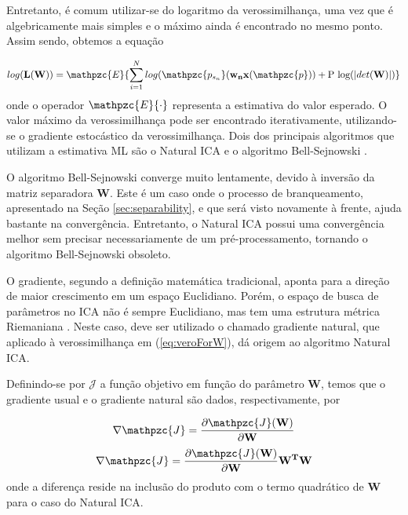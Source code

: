     Entretanto, é comum utilizar-se do logaritmo da verossimilhança, uma vez que é algebricamente mais simples e o máximo ainda é encontrado no mesmo ponto. Assim sendo, obtemos a equação
    
        \begin{equation}
        \label{eq:logverossimilance}
        log(\mathbf{L(W)}) = \mathpzc{E}\{\sum_{i=1}^Nlog(\mathpzc{p_{s_n}}(\mathbf{w_nx}(\mathpzc{p})) + \text{P log}(|det(\mathbf{W})|)\}
    \end{equation}
    onde o operador $\mathpzc{E}\{\cdot\}$ representa a estimativa do valor esperado. O valor máximo da verossimilhança pode ser encontrado iterativamente, utilizando-se o gradiente estocástico da verossimilhança. Dois dos principais algoritmos que utilizam a estimativa ML são o Natural ICA \cite{NaturalICA} e o algoritmo Bell-Sejnowski \cite{ICAML}.
    
    O algoritmo Bell-Sejnowski converge muito lentamente, devido à inversão da matriz separadora $\mathbf{W}$. Este é um caso onde o processo de branqueamento, apresentado na Seção \ref{sec:separability}, e que será visto novamente à frente, ajuda bastante na convergência. Entretanto, o Natural ICA possui uma convergência melhor sem precisar necessariamente de um pré-processamento, tornando o algoritmo Bell-Sejnowski obsoleto.
    
    O gradiente, segundo a definição matemática tradicional, aponta para a direção de maior crescimento em um espaço Euclidiano. Porém, o espaço de busca de parâmetros no ICA não é sempre Euclidiano, mas tem uma estrutura métrica Riemaniana \cite{Riemenn}. Neste caso, deve ser utilizado o chamado gradiente natural, que aplicado à verossimilhança em (\ref{eq:veroForW}), dá origem ao algoritmo Natural ICA.
    
    Definindo-se por $\mathcal{J}$ a função objetivo em função do parâmetro $\mathbf{W}$, temos que o gradiente usual e o gradiente natural são dados, respectivamente, por
    
    \begin{equation}
        \label{eq:gradiente}
        \nabla\mathpzc{J} = \frac{\partial \mathpzc{J}(\mathbf{W})}{\partial \mathbf{W}}
    \end{equation}
    \begin{equation}
        \label{eq:naturalgradiente}
        \nabla\mathpzc{J} = \frac{\partial \mathpzc{J}(\mathbf{W})}{\partial \mathbf{W}}\mathbf{W^T}\mathbf{W}
    \end{equation}
    onde a diferença reside na inclusão do produto com o termo quadrático de $\mathbf{W}$ para o caso do Natural ICA.
    
